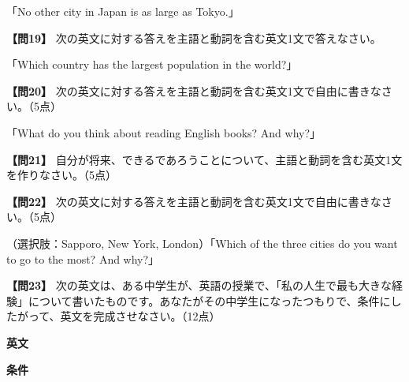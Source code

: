 \noindent「No other city in Japan is as large as Tokyo.」

\testqsep
\testquestion
\noindent\textbf{【問19】} 次の英文に対する答えを主語と動詞を含む英文1文で答えなさい。

\noindent「Which country has the largest population in the world?」

\testqsep
\testquestionwide
\noindent\textbf{【問20】} 次の英文に対する答えを主語と動詞を含む英文1文で自由に書きなさい。（5点）

\noindent「What do you think about reading English books? And why?」

\testqsep
\testquestionwide
\noindent\textbf{【問21】} 自分が将来、できるであろうことについて、主語と動詞を含む英文1文を作りなさい。（5点）

\testqsep
\testquestionwide
\noindent\textbf{【問22】} 次の英文に対する答えを主語と動詞を含む英文1文で自由に書きなさい。（5点）

\noindent（選択肢：Sapporo, New York, London）「Which of the three cities do you want to go to the most? And why?」

\vspace{0.5em}
\testqsep

\newpage
\testquestionwide
\noindent\textbf{【問23】} 次の英文は、ある中学生が、英語の授業で、「私の人生で最も大きな経験」について書いたものです。あなたがその中学生になったつもりで、条件にしたがって、英文を完成させなさい。（12点）

\vspace{0.5em}
\noindent\textbf{英文}

\noindent{}%

\vspace{0.5em}
\noindent\textbf{条件}

\noindent{}%

